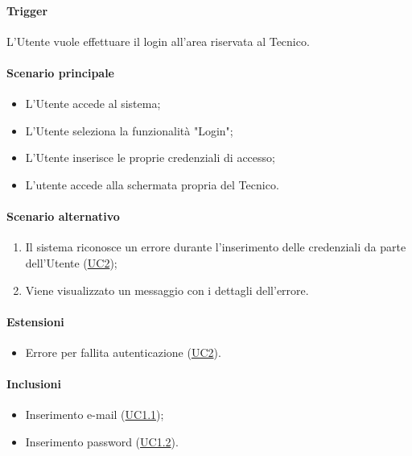 \paragraph*{Trigger}
L'Utente vuole effettuare il login all'area riservata al Tecnico.

\paragraph*{Scenario principale}
\begin{itemize}
  \item L'Utente accede al sistema;
  \item L'Utente seleziona la funzionalità "Login";
  \item L'Utente inserisce le proprie credenziali di accesso;
  \item L'utente accede alla schermata propria del Tecnico.
\end{itemize}

\paragraph*{Scenario alternativo}
\begin{enumerate}
  \item Il sistema riconosce un errore durante l'inserimento delle credenziali da parte dell'Utente (\hyperref[UC2]{UC2});
  \item Viene visualizzato un messaggio con i dettagli dell'errore.
\end{enumerate}

\paragraph*{Estensioni}
\begin{itemize}
  \item Errore per fallita autenticazione (\hyperref[UC2]{UC2}).
\end{itemize}

\paragraph*{Inclusioni}
\begin{itemize}
  \item Inserimento e-mail (\hyperref[UC1point1]{UC1.1});
  \item Inserimento password (\hyperref[UC1point2]{UC1.2}).
\end{itemize}


